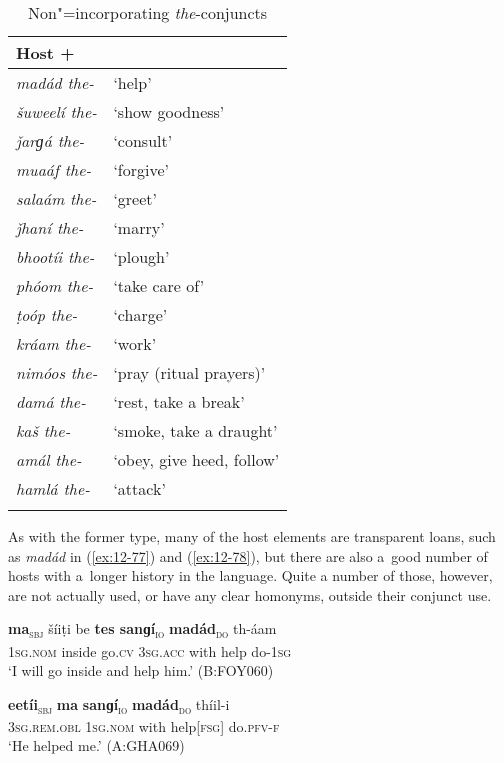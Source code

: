 \begin{exe}
\begin{table}[ht]
\caption{Non"=incorporating \textit{the}-conjuncts}
\begin{tabularx}{.75\textwidth}{ l@{\hspace{45pt}} Q} 
\lsptoprule
Host +  &
\\\midrule
\textit{madád the-} &
`help'\\
\textit{šuweelí the-} &
`show goodness'\\
\textit{ǰarɡá the-} &
`consult'\\
\textit{muaáf the-} &
`forgive'\\
\textit{salaám the-} &
`greet'\\
\textit{ǰhaní the-} &
`marry'\\
\textit{bhootíi the-} &
`plough'\\
\textit{phóom the-} &
`take care of'\\
\textit{ṭoóp the-} &
`charge'\\
\textit{kráam the-} &
`work'\\
\textit{nimóos the-} &
`pray (ritual prayers)'\\
\textit{damá the-} &
`rest, take a break'\\
\textit{kaš the-} &
`smoke, take a draught'\\
\textit{amál the-} &
`obey, give heed, follow'\\
\textit{hamlá the-} &
`attack'\\\lspbottomrule
\end{tabularx}
\label{tab:12-4}
\end{table}


As with the former type, many of the host elements are transparent loans, such as \textit{madád} in (\ref{ex:12-77}) and (\ref{ex:12-78}), but there are also a~good number of hosts with a~longer history in the language. Quite a number of those, however, are not actually used, or have any clear homonyms, outside their conjunct use.

\begin{exe}
\ex
\label{ex:12-77}
\gll {\ob}\textbf{ma}{\cb}\textsubscript{\textsc{\upshape sbj}} šíiṭi be {\ob}\textbf{tes sanɡí}{\cb}\textsubscript{\textsc{\upshape io}} {\ob}\textbf{madád}{\cb}\textsubscript{\textsc{\upshape do}} th-áam\\
\textsc{1sg.nom} inside go.\textsc{cv} \textsc{3sg.acc} with help do-\textsc{1sg}\\
\glt `I will go inside and help him.' (B:FOY060)
\end{exe}
\begin{exe}
\ex
\label{ex:12-78}
\gll {\ob}\textbf{eetíi}{\cb}\textsubscript{\textsc{\upshape sbj}} {\ob}\textbf{ma} \textbf{sanɡí}{\cb}\textsubscript{\textsc{\upshape io}} {\ob}\textbf{madád}{\cb}\textsubscript{\textsc{\upshape do}} thíil-i\\
\textsc{3sg.rem.obl} \textsc{1sg.nom} with help[\textsc{fsg]} do.\textsc{pfv-f}\\
\glt `He helped me.' (A:GHA069)
\end{exe}


\end{exe}
